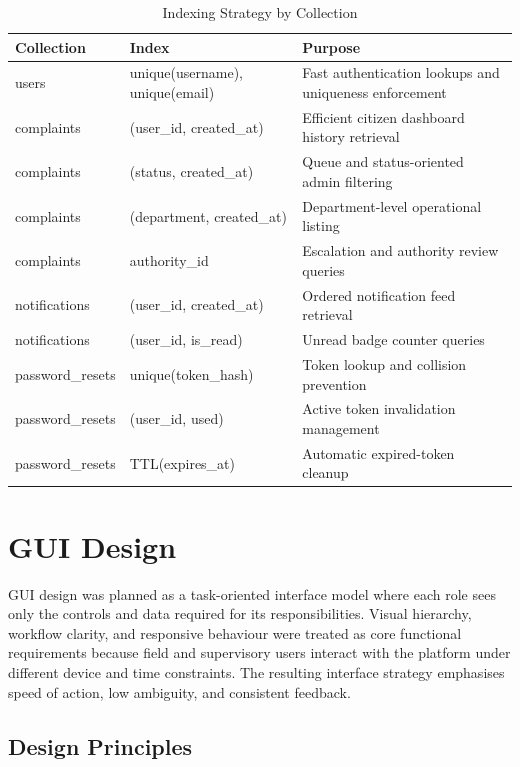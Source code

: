 \begin{table}[H]
\centering
\begin{tabularx}{\textwidth}{|>{\RaggedRight\arraybackslash}X|>{\RaggedRight\arraybackslash}X|>{\RaggedRight\arraybackslash}X|}
\hline
\textbf{Collection} & \textbf{Index} & \textbf{Purpose} \\ \hline
users & unique(username), unique(email) & Fast authentication lookups and uniqueness enforcement \\ \hline
complaints & (user\_id, created\_at) & Efficient citizen dashboard history retrieval \\ \hline
complaints & (status, created\_at) & Queue and status-oriented admin filtering \\ \hline
complaints & (department, created\_at) & Department-level operational listing \\ \hline
complaints & authority\_id & Escalation and authority review queries \\ \hline
notifications & (user\_id, created\_at) & Ordered notification feed retrieval \\ \hline
notifications & (user\_id, is\_read) & Unread badge counter queries \\ \hline
password\_resets & unique(token\_hash) & Token lookup and collision prevention \\ \hline
password\_resets & (user\_id, used) & Active token invalidation management \\ \hline
password\_resets & TTL(expires\_at) & Automatic expired-token cleanup \\ \hline
\end{tabularx}
\captionsetup{position=bottom}
\caption{Indexing Strategy by Collection}
\label{tab:indexing-strategy}
\end{table}

\section{GUI Design}

GUI design was planned as a task-oriented interface model where each role sees only the controls and data required for its responsibilities. Visual hierarchy, workflow clarity, and responsive behaviour were treated as core functional requirements because field and supervisory users interact with the platform under different device and time constraints. The resulting interface strategy emphasises speed of action, low ambiguity, and consistent feedback.

\subsection{Design Principles}


